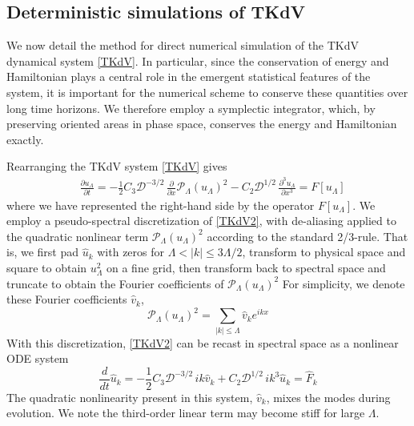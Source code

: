 \documentclass[11pt]{article}
\newcommand{\pd}[2]    { \frac{\partial #1} {\partial #2} }
\newcommand{\td}[2] { \frac{d #1} { d #2 } }
\newcommand{\abs}[1]{\left| #1 \right|}
\newcommand{\drat}{\mathcal{D}}
\newcommand{\uhat}{\hat{u}}
\newcommand{\Proj}{\mathcal{P}_{\Lambda}}
\newcommand{\uL}{u_{\Lambda}}
\newcommand{\RHS}{F}
\newcommand{\RHSh}{\hat{\RHS}}
\newcommand{\usqdah}{\hat{v}} %
\begin{document}
\subsection{Deterministic simulations of TKdV}

We now detail the method for direct numerical simulation of the TKdV dynamical system \eqref{TKdV}. In particular, since the conservation of energy and Hamiltonian plays a central role in the emergent statistical features of the system, it is important for the numerical scheme to conserve these quantities over long time horizons. We therefore employ a symplectic integrator, which, by preserving oriented areas in phase space, conserves the energy and Hamiltonian exactly.

Rearranging the TKdV system \eqref{TKdV} gives
\begin{align}
\label{TKdV2}
&\pd{\uL}{t} = -  \frac{1}{2} C_3 \drat^{-3/2} \, \pd{}{x} \Proj (\uL)^2 - C_2 \drat^{1/2} \, \frac{\partial^3 \uL}{\partial x^3} = \RHS[\uL]
\end{align}	
where we have represented the right-hand side by the operator $\RHS[\uL]$. We employ a pseudo-spectral discretization of \eqref{TKdV2}, with de-aliasing applied to the quadratic nonlinear term $\Proj (\uL)^2$ according to the standard 2/3-rule. That is, we first pad $\uhat_k$ with zeros for $\Lambda < \abs{k} \le 3\Lambda/2$, transform to physical space and square to obtain $\uL^2$ on a fine grid, then transform back to spectral space and truncate to obtain the Fourier coefficients of $\Proj (\uL)^2$
For simplicity, we denote these Fourier coefficients $\usqdah_k$,
\begin{equation}
\Proj (\uL)^2 = \sum_{\abs{k} \le \Lambda} \usqdah_k e^{i k x}
\end{equation}
With this discretization, \eqref{TKdV2} can be recast in spectral space as a nonlinear ODE system
\begin{equation}
\label{TKdVDisc}
\td{}{t} \uhat_k =  -\frac{1}{2} C_3 \drat^{-3/2} \, ik \usqdah_k + C_2 \drat^{1/2} \, ik^{3} \uhat_k = \RHSh_k
\end{equation}
The quadratic nonlinearity present in this system, $\usqdah_k$, mixes the modes during evolution. We note the third-order linear term may become stiff for large $\Lambda$.
\end{document}
